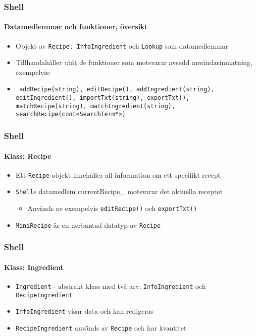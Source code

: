 %
%

\begin{frame}
  \frametitle{Shell}
  \framesubtitle{Datamedlemmar och funktioner, översikt}
  \begin{itemize}
    \item Objekt av \texttt{Recipe, InfoIngredient} och \texttt{Lookup} som datamedlemmar
    \item<2-> Tillhandahåller utåt de funktioner som motsvarar avsedd användarinmatning, exempelvis:
    \item<2-> \texttt{
      addRecipe(string), editRecipe(),
      addIngredient(string), editIngredient(),
      importTxt(string), exportTxt(),
      matchRecipe(string), matchIngredient(string),
      searchRecipe(cont<SearchTerm*>)
    }
  \end{itemize} 
\end{frame}

\begin{frame}
  \frametitle{Shell}
  \framesubtitle{Klass: Recipe}
  \begin{itemize}
  \item Ett \texttt{Recipe}-objekt innehåller all information om ett specifikt recept
  \item<2-> \texttt{Shell}s datamedlem currentRecipe\_ motsvarar det aktuella receptet
    \begin{itemize}
    \item Används av exempelvis \texttt{editRecipe()} och \texttt{exportTxt()}
    \end{itemize}
  \item<3-> \texttt{MiniRecipe} är en nerbantad datatyp av \texttt{Recipe}
  \end{itemize}
\end{frame}

\begin{frame}
  \frametitle{Shell}
  \framesubtitle{Klass: Ingredient}
  \begin{itemize}
  \item \texttt{Ingredient} - abstrakt klass med två arv: \texttt{InfoIngredient} och \texttt{RecipeIngredient}
  \item<2-> \texttt{InfoIngredient} visar data och kan redigeras
  \item<3-> \texttt{RecipeIngredient} används av \texttt{Recipe} och har kvantitet
  \end{itemize}
\end{frame}

